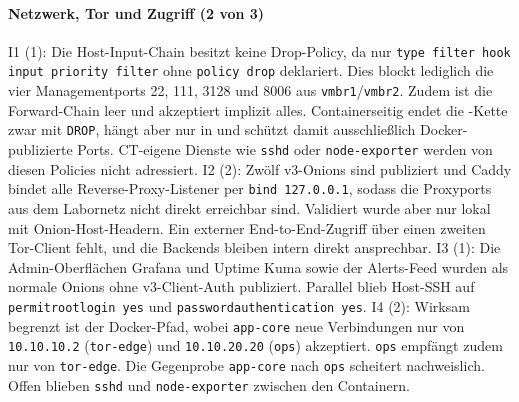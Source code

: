 \paragraph{Netzwerk, Tor und Zugriff (2 von 3)}
I1 (1): Die Host-Input-Chain besitzt keine Drop-Policy, da  nur
\texttt{type filter hook input priority filter} ohne
\texttt{policy drop} deklariert. Dies blockt lediglich die vier Managementports 22, 111,
3128 und 8006 aus \texttt{vmbr1}/\texttt{vmbr2}.
Zudem ist die Forward-Chain leer und akzeptiert implizit alles. 
Containerseitig endet die -Kette zwar mit \texttt{DROP}, hängt aber nur in  und schützt damit ausschließlich Docker-publizierte Ports.
\ac{CT}-eigene Dienste wie \texttt{sshd} oder \texttt{node-exporter} werden von diesen Policies nicht adressiert.\cite{hostnftablesA,dockerfirewallA,selfauditA}
I2 (2): Zwölf v3-Onions sind publiziert und Caddy bindet alle Reverse-Proxy-Listener per \texttt{bind 127.0.0.1}, sodass die Proxyports aus dem Labornetz nicht direkt erreichbar sind.
Validiert wurde aber nur lokal mit Onion-Host-Headern.
Ein externer End-to-End-Zugriff über einen zweiten Tor-Client fehlt, und die Backends bleiben intern direkt ansprechbar.\cite{caddyfileA,runbookA,selfauditA}
I3 (1): Die Admin-Oberflächen Grafana und Uptime Kuma sowie der Alerts-Feed wurden als normale Onions ohne v3-Client-Auth publiziert. Parallel blieb Host-\ac{SSH} auf \texttt{permitrootlogin yes} und \texttt{passwordauthentication yes}.\cite{runbookA,selfauditA}
I4 (2): Wirksam begrenzt ist der Docker-Pfad, wobei \texttt{app-core} neue Verbindungen nur von \texttt{10.10.10.2} (\texttt{tor-edge}) und \texttt{10.10.20.20} (\texttt{ops}) akzeptiert.
\texttt{ops} empfängt zudem nur von \texttt{tor-edge}.
Die Gegenprobe \texttt{app-core} nach \texttt{ops} scheitert nachweislich.
Offen blieben \texttt{sshd} und \texttt{node-exporter} zwischen den Containern.\cite{dockerfirewallA,runbookA,selfauditA}

